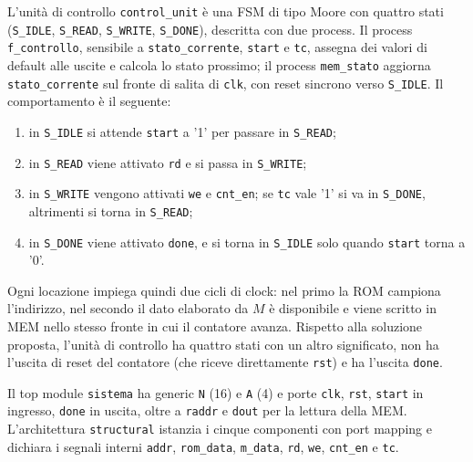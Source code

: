 L'unità di controllo \texttt{control\_unit} è una FSM di tipo Moore con quattro stati (\texttt{S\_IDLE}, \texttt{S\_READ}, \texttt{S\_WRITE}, \texttt{S\_DONE}), descritta con due process. Il process \texttt{f\_controllo}, sensibile a \texttt{stato\_corrente}, \texttt{start} e \texttt{tc}, assegna dei valori di default alle uscite e calcola lo stato prossimo; il process \texttt{mem\_stato} aggiorna \texttt{stato\_corrente} sul fronte di salita di \texttt{clk}, con reset sincrono verso \texttt{S\_IDLE}. Il comportamento è il seguente:
\begin{enumerate}
  \item in \texttt{S\_IDLE} si attende \texttt{start} a '1' per passare in \texttt{S\_READ};
  \item in \texttt{S\_READ} viene attivato \texttt{rd} e si passa in \texttt{S\_WRITE};
  \item in \texttt{S\_WRITE} vengono attivati \texttt{we} e \texttt{cnt\_en}; se \texttt{tc} vale '1' si va in \texttt{S\_DONE}, altrimenti si torna in \texttt{S\_READ};
  \item in \texttt{S\_DONE} viene attivato \texttt{done}, e si torna in \texttt{S\_IDLE} solo quando \texttt{start} torna a '0'.
\end{enumerate}
Ogni locazione impiega quindi due cicli di clock: nel primo la ROM campiona l'indirizzo, nel secondo il dato elaborato da $M$ è disponibile e viene scritto in MEM nello stesso fronte in cui il contatore avanza. Rispetto alla soluzione proposta, l'unità di controllo ha quattro stati con un altro significato, non ha l'uscita di reset del contatore (che riceve direttamente \texttt{rst}) e ha l'uscita \texttt{done}.


Il top module \texttt{sistema} ha generic \texttt{N} (16) e \texttt{A} (4) e porte \texttt{clk}, \texttt{rst}, \texttt{start} in ingresso, \texttt{done} in uscita, oltre a \texttt{raddr} e \texttt{dout} per la lettura della MEM. L'architettura \texttt{structural} istanzia i cinque componenti con port mapping e dichiara i segnali interni \texttt{addr}, \texttt{rom\_data}, \texttt{m\_data}, \texttt{rd}, \texttt{we}, \texttt{cnt\_en} e \texttt{tc}.


\simulazione

